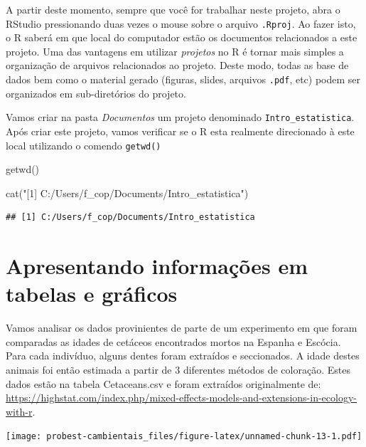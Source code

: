 \documentclass[
]{book}
\newenvironment{Shaded}{\begin{snugshade}}{\end{snugshade}}
\newcommand{\FunctionTok}[1]{\textcolor[rgb]{0.00,0.00,0.00}{#1}}
\newcommand{\NormalTok}[1]{#1}
\newcommand{\StringTok}[1]{\textcolor[rgb]{0.31,0.60,0.02}{#1}}
\begin{document}
A partir deste momento, sempre que você for trabalhar neste projeto, abra o RStudio pressionando duas vezes o mouse sobre o arquivo \texttt{.Rproj}. Ao fazer isto, o R saberá em que local do computador estão os documentos relacionados a este projeto. Uma das vantagens em utilizar \emph{projetos} no R é tornar mais simples a organização de arquivos relacionados ao projeto. Deste modo, todas as base de dados bem como o material gerado (figuras, slides, arquivos \texttt{.pdf}, etc) podem ser organizados em sub-diretórios do projeto.

Vamos criar na pasta \emph{Documentos} um projeto denominado \texttt{Intro\_estatistica}. Após criar este projeto, vamos verificar se o R esta realmente direcionado à este local utilizando o comendo \texttt{getwd()}

\begin{Shaded}
\begin{Highlighting}[]
\FunctionTok{getwd}\NormalTok{()}
\end{Highlighting}
\end{Shaded}

\begin{Shaded}
\begin{Highlighting}[]
\FunctionTok{cat}\NormalTok{(}\StringTok{"[1] C:/Users/f\_cop/Documents/Intro\_estatistica"}\NormalTok{)}
\end{Highlighting}
\end{Shaded}

\begin{verbatim}
## [1] C:/Users/f_cop/Documents/Intro_estatistica
\end{verbatim}

\hypertarget{descrit}{%
\chapter{Apresentando informações em tabelas e gráficos}\label{descrit}}

Vamos analisar os dados provinientes de parte de um experimento em que foram comparadas as idades de cetáceos encontrados mortos na Espanha e Escócia. Para cada indivíduo, alguns dentes foram extraídos e seccionados. A idade destes animais foi então estimada a partir de 3 diferentes métodos de coloração. Estes dados estão na tabela Cetaceans.csv e foram extraídos originalmente de: \url{https://highstat.com/index.php/mixed-effects-models-and-extensions-in-ecology-with-r}.

\texttt{[image: probest-cambientais\_files/figure-latex/unnamed-chunk-13-1.pdf]}
\end{document}

